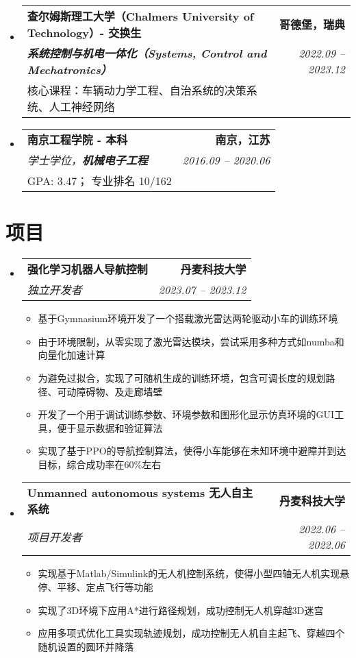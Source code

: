 \documentclass[letterpaper,11pt]{article}
\makeatletter
\newcommand{\resumeItem}[1]{
  \item\small{
    {#1 \vspace{-2pt}}
  }
}
\newcommand{\resumeSubheading}[4]{
  \vspace{-2pt}\item\small{
    \begin{tabular*}{0.97\textwidth}[t]{l@{\extracolsep{\fill}}r}
      \textbf{#1} & \textbf{#2} \\
      \textit{#3} & \textit{#4} \\
    \end{tabular*}\vspace{-7pt}
  }
}
\newcommand{\resumeSubheadingExtended}[5]{  
  \item\small{
    \begin{tabular*}{0.97\textwidth}{@{\extracolsep{\fill}}lr}
      \textbf{#1} & \textbf{#2} \\  %
      \textit{#3} & \textit{#4} \\  %
      #5 &  %
    \end{tabular*}\vspace{-10pt}
  }
}
\newcommand{\resumeSubHeadingListStart}{\begin{itemize}[leftmargin=0.15in, label={}]}
\newcommand{\resumeSubHeadingListEnd}{\end{itemize}}
\newcommand{\resumeItemListStart}{\begin{itemize}}
\newcommand{\resumeItemListEnd}{\end{itemize}\vspace{-5pt}}
\makeatother
\begin{document}
  \vspace{0.5mm} %

  \resumeSubHeadingListStart
    \resumeSubheadingExtended
      {查尔姆斯理工大学（Chalmers University of Technology）- 交换生}{哥德堡，瑞典}
      {\textbf{系统控制与机电一体化（Systems, Control and Mechatronics）}}{2022.09 -- 2023.12}
      {核心课程：车辆动力学工程、自治系统的决策系统、人工神经网络}
  \resumeSubHeadingListEnd
  
  \vspace{0.5mm} %

  \resumeSubHeadingListStart
    \resumeSubheadingExtended
      {南京工程学院 - 本科}{南京，江苏}
      {学士学位，\textbf{机械电子工程}}{2016.09 -- 2020.06}
      {GPA: 3.47； 专业排名 10/162}
  \resumeSubHeadingListEnd

\section{项目}
  \resumeSubHeadingListStart

    \resumeSubheading
      {\textbf{强化学习机器人导航控制 \; \href{https://1drv.ms/v/s!Al-YZOpjHxorgslaTIu4oeTj8TYROw?e=EflSJj}{\faVideoCamera} \;  \href{https://github.com/SpartanTan/RLATR}{\faGithub}}}{丹麦科技大学}
      {独立开发者}{2023.07 -- 2023.12}
      \resumeItemListStart
        \resumeItem{基于Gymnasium环境开发了一个搭载激光雷达两轮驱动小车的训练环境}
        \resumeItem{由于环境限制，从零实现了激光雷达模块，尝试采用多种方式如numba和向量化加速计算}
        \resumeItem{为避免过拟合，实现了可随机生成的训练环境，包含可调长度的规划路径、可动障碍物、及走廊墙壁}
        \resumeItem{开发了一个用于调试训练参数、环境参数和图形化显示仿真环境的GUI工具，便于显示数据和验证算法}
        \resumeItem{实现了基于PPO的导航控制算法，使得小车能够在未知环境中避障并到达目标，综合成功率在60\%左右}
    \resumeItemListEnd
      
    \resumeSubheading
      {\textbf{Unmanned autonomous systems 无人自主系统  \; \href{https://1drv.ms/v/s!Al-YZOpjHxorgslZm5SJR7mVF_eoPw?e=4kRkvd}{\faVideoCamera} \;  \href{https://github.com/SpartanTan/31390-UAS-2022}{\faGithub}}}{丹麦科技大学}
      {项目开发者}{2022.06 -- 2022.06}
      \resumeItemListStart
        \resumeItem{实现基于Matlab/Simulink的无人机控制系统，使得小型四轴无人机实现悬停、平移、定点飞行等功能}
        \resumeItem{实现了3D环境下应用A*进行路径规划，成功控制无人机穿越3D迷宫}
        \resumeItem{应用多项式优化工具实现轨迹规划，成功控制无人机自主起飞、穿越四个随机设置的圆环并降落}
      \resumeItemListEnd
  \resumeSubHeadingListEnd
\end{document}
